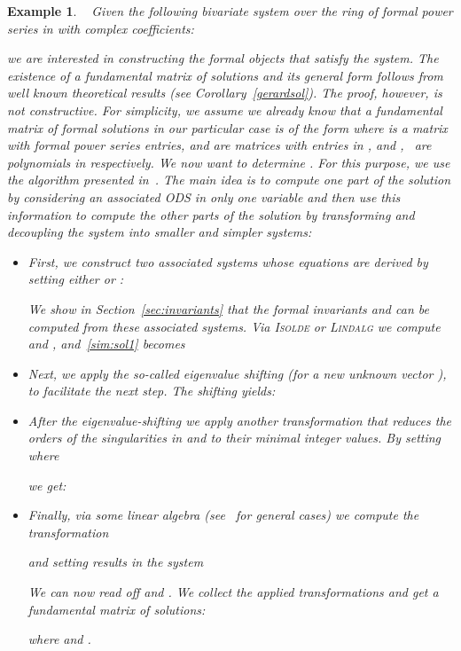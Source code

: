 \documentclass[final,1p,times,number,amsthm]{elsart}
\newtheorem{example}[lemma]{Example}
\begin{document}
\begin{example}~\cite[Example 2]{key101}
  \label{ex:sim}
  Given the following bivariate system over the ring of formal power series in
   with complex coefficients:
  
  we are interested in constructing the formal objects  that satisfy the
  system. The existence of a fundamental matrix of solutions and its general
  form follows from well known theoretical results (see
  Corollary~\ref{gerardsol}). The proof, however, is not constructive. For
  simplicity, we assume we already know that a fundamental matrix of formal
  solutions in our particular case is of the form
   where
   is a matrix with formal power series entries,  and 
  are matrices with entries in , and ,~ are polynomials in
   respectively. We now want to determine
  .  For this purpose, we use the algorithm
  presented in~\cite{key101}. The main idea is to compute one part
  of the solution by considering an associated ODS in only one variable and then
  use this information to compute the other parts of the solution by
  transforming and decoupling the system into smaller and simpler systems:

  \begin{itemize}
  \item First, we construct two associated systems whose equations are derived
    by setting either  or :
    
    We show in Section~\ref{sec:invariants} that the formal invariants  and  can be computed from these associated systems. Via
    \textsc{Isolde} or \textsc{Lindalg} we compute  and
    , 
    and~\eqref{sim:sol1} becomes
    
  \item Next, we apply the so-called eigenvalue shifting
     (for a new
    unknown vector ), to facilitate the next step. The shifting
    yields:\goodbreak
    
  \item After the eigenvalue-shifting we apply another transformation that
    reduces the orders of the singularities in  and  to their minimal
    integer values. By setting  where
    
    we get:
    
  \item Finally, via some linear algebra (see~\cite[Chapter 3]{key73} for
    general cases) we compute the transformation
    
    and setting  results in the system


We can now read off  and . We collect the applied
transformations and get a fundamental matrix of solutions:
    
    where  and
    .
  \end{itemize}
\end{example}
\end{document}
